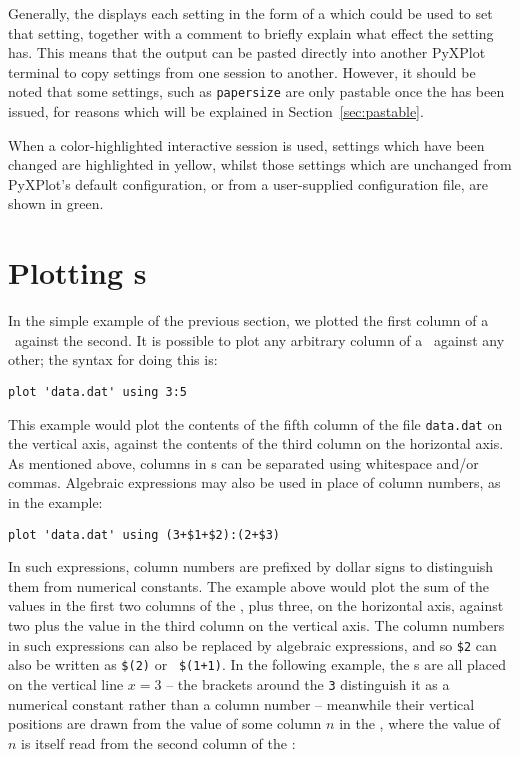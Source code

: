 Generally, the  displays each setting in the form of a
 which could be used to set that setting, together with a comment
to briefly explain what effect the setting has. This means that the output can
be pasted directly into another PyXPlot terminal to copy settings from one
session to another. However, it should be noted that some settings, such as
{\tt papersize} are only pastable once the  has
been issued, for reasons which will be explained in Section~\ref{sec:pastable}.

When a color-highlighted interactive session is used, settings which have been
changed are highlighted in yellow, whilst those settings which are unchanged
from PyXPlot's default configuration, or from a user-supplied configuration
file, are shown in green.

\section{Plotting \datafile s}
\label{sec:plot_datafiles}

In the simple example of the previous section, we plotted the first column of a
\datafile\ against the second. It is possible to plot any arbitrary column of a
\datafile\ against any other; the syntax for doing this is:

\begin{verbatim}
plot 'data.dat' using 3:5
\end{verbatim}

\noindent This example would plot the contents of the fifth column of the file
{\tt data.dat} on the vertical axis, against the contents of the third column
on the horizontal axis. As mentioned above, columns in \datafile s can be
separated using whitespace and/or commas.  Algebraic expressions may also be
used in place of column numbers, as in the example:

\begin{verbatim}
plot 'data.dat' using (3+$1+$2):(2+$3)
\end{verbatim}

\noindent In such expressions, column numbers are prefixed by dollar signs to
distinguish them from numerical constants. The example above would plot the sum
of the values in the first two columns of the \datafile, plus three, on the
horizontal axis, against two plus the value in the third column on the vertical
axis. The column numbers in such expressions can also be replaced by algebraic
expressions, and so {\tt \$2} can also be written as {\tt \$(2)} or {\tt
\$(1+1)}. In the following example, the \datapoint s are all placed on the
vertical line $x=3$ -- the brackets around the {\tt 3} distinguish it as a
numerical constant rather than a column number -- meanwhile their vertical
positions are drawn from the value of some column $n$ in the \datafile, where
the value of $n$ is itself read from the second column of the \datafile:

